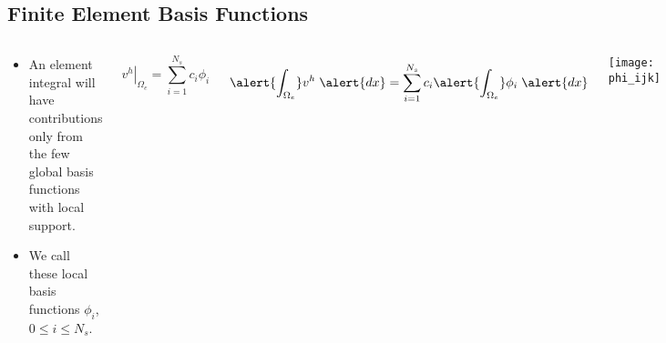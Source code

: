 \subsection*{Finite Element Basis Functions}
\begin{frame}
    \begin{columns}[t]
    \begin{block}{}


	\begin{itemize}
	  \item{An element integral will have contributions only
	    from the few global basis functions with local support.}
	  \item{We call these local basis functions $\phi_i$, $0 \leq i \leq N_s$.}
	\end{itemize}
    \end{block}

	    \begin{equation}
	      \nonumber
	      \left. v^h \right|_{\Omega_e} = \sum_{i=1}^{N_s} c_i \phi_i
	    \end{equation}
      {
	    \begin{equation}
	      \nonumber
	      \alert{\int_{\Omega_e}} v^h \;\alert{dx}
	      = \sum_{i=1}^{N_s} c_i \alert{\int_{\Omega_e}}\phi_i \;\alert{dx}
	    \end{equation}

      }
      \begin{center}
	      \texttt{[image: phi\_ijk]}
      \end{center}
    \end{columns}
\end{frame}
